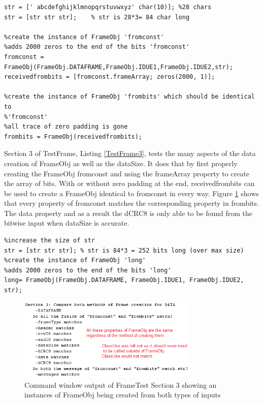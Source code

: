 \begin{lstlisting} 
str = [' abcdefghijklmnopqrstuvwxyz' char(10)]; %28 chars
str = [str str str];    % str is 28*3= 84 char long

%create the instance of FrameObj 'fromconst'
%adds 2000 zeros to the end of the bits 'fromconst'
fromconst = FrameObj(FrameObj.DATAFRAME,FrameObj.IDUE1,FrameObj.IDUE2,str);
receivedfrombits = [fromconst.frameArray; zeros(2000, 1)];

%create the instance of FrameObj 'frombits' which should be identical to
%'fromconst' 
%all trace of zero padding is gone
frombits = FrameObj(receivedfrombits);
\end{lstlisting} 

Section 3 of TestFrame, Listing \ref{TestFrame3}, tests the many aspects of the data creation of FrameObj as well as the dataSize. It does that by first properly creating the FrameObj fromconst and using the frameArray property to create the array of bits. With or without zero padding at the end, receivedfrombits can be used to create a FrameObj identical to fromconst in every way. Figure \ref{fig:FrameTest3} shows that every property of fromconst matches the corresponding property in frombits. The data property and as a result the dCRC8 is only able to be found from the bitwise input when dataSize is accurate.   

\begin{lstlisting} 
%increase the size of str
str = [str str str]; % str is 84*3 = 252 bits long (over max size)
%create the instance of FrameObj 'long'
%adds 2000 zeros to the end of the bits 'long'
long= FrameObj(FrameObj.DATAFRAME, FrameObj.IDUE1, FrameObj.IDUE2, str);
\end{lstlisting} 
\begin{figure}[ht]
    \includegraphics[width=0.77\textwidth]{FrameTest3.PNG}
    \caption{Command window output of FrameTest Section 3 showing an instances of FrameObj being created from both types of inputs }
    \label{fig:FrameTest3}
\end{figure}

